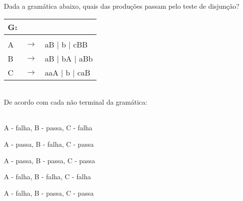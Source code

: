 \question[10] 

Dada a gramática abaixo, quais das produções passam pelo teste de disjunção?\\
\begin{tabular}{|l c l}
	G: & & \\
	\hline \\
	A & $\rightarrow$ & aB | b | cBB \\
    B & $\rightarrow$ & aB | bA | aBb \\
	C & $\rightarrow$ & aaA | b | caB \\
\end{tabular}
\\
De acordo com cada não terminal da gramática:\\
\\
\begin{choices}
\item A - falha, B - passa, C - falha
\item A - passa, B - falha, C - passa %
\item A - passa, B - passa, C - passa
\item A - falha, B - falha, C - falha
\item A - falha, B - passa, C - passa
\end{choices}
\answerline

